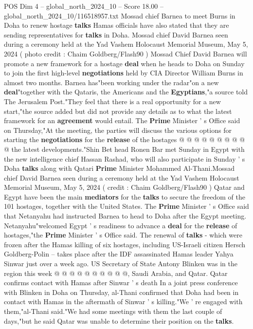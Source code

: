\begin{textsample}{POS Dim 4 – global\_north\_2024\_10 – Score 18.00 – global\_north\_2024\_10/116518957.txt}  \label{ex:f4_pos_405}
Mossad chief Barnea to meet Burns in Doha to renew hostage \textbf{talks} Hamas officials have also stated that they are sending representatives for \textbf{talks} in Doha.
Mossad chief David Barnea seen during a ceremony held at the Yad Vashem Holocaust Memorial Museum, May 5, 2024 ( photo credit : Chaim Goldberg/Flash90 ) Mossad Chief David Barnea will promote a new framework for a hostage \textbf{deal} when he heads to Doha on Sunday to join the first high-level \textbf{negotiations} held by CIA Director William Burns in almost two months.
Barnea has"been working under the radar"on a new \textbf{deal}"together with the Qataris, the Americans and the \textbf{Egyptians},"a source told The Jerusalem Post."They feel that there is a real opportunity for a new start,"the source added but did not provide any details as to what the latest framework for an \textbf{agreement} would entail.
The \textbf{Prime} Minister ' s Office said on Thursday,"At the meeting, the parties will discuss the various options for starting the \textbf{negotiations} for the \textbf{release} of the hostages @ @ @ @ @ @ @ @ @ @ the latest developments."Shin Bet head Ronen Bar met Sunday in Egypt with the new intelligence chief Hassan Rashad, who will also participate in Sunday ' s Doha \textbf{talks} along with Qatari \textbf{Prime} Minister Mohammed Al-Thani.Mossad chief David Barnea seen during a ceremony held at the Yad Vashem Holocaust Memorial Museum, May 5, 2024 ( credit : Chaim Goldberg/Flash90 ) Qatar and Egypt have been the main \textbf{mediators} for the \textbf{talks} to secure the freedom of the 101 hostages, together with the United States.
The \textbf{Prime} Minister ' s Office said that Netanyahu had instructed Barnea to head to Doha after the Egypt meeting.
Netanyahu"welcomed Egypt ' s readiness to advance a \textbf{deal} for the \textbf{release} of hostages,"the \textbf{Prime} Minister ' s Office said.
The renewal of \textbf{talks} - which were frozen after the Hamas killing of six hostages, including US-Israeli citizen Hersch Goldberg-Polin -- takes place after the IDF assassinated Hamas leader Yahya Sinwar just over a week ago.
US Secretary of State Antony Blinken was in the region this week @ @ @ @ @ @ @ @ @ @, Saudi Arabia, and Qatar.
Qatar confirms contact with Hamas after Sinwar ' s death In a joint press conference with Blinken in Doha on Thursday, al-Thani confirmed that Doha had been in contact with Hamas in the aftermath of Sinwar ' s killing."We ' re engaged with them,"al-Thani said."We had some meetings with them the last couple of days,"but he said Qatar was unable to determine their position on the \textbf{talks}.

\end{textsample}

